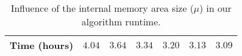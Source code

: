\begin{table*}[ht]
\begin{center}
{\begin{tabular}{|l|c|c|c|c|c|c|}
Time (hours)                                                      & $4.04$                       & $3.64$                      & $3.34$                      & $3.20$                      & $3.13$                      & $3.09$      \\
\hline
\end{tabular}
\vspace{-1mm}
}
\end{center}
\caption{Influence of the internal memory area size ($\mu$) in our algorithm runtime.}
\label{tab:diskaccess}
\vspace{-14mm}
\end{table*}



